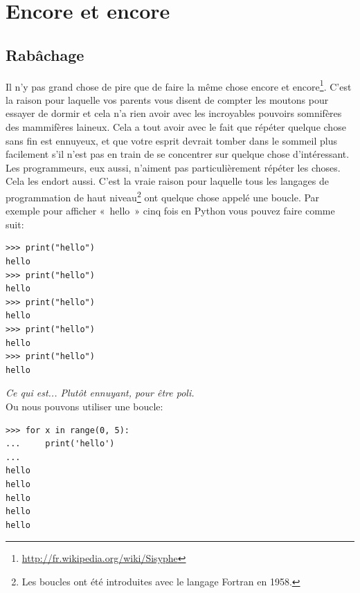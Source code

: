 



\chapter{Encore et encore}
\section{Rabâchage}
Il n'y pas grand chose de pire que de faire la même chose encore et encore\footnote{\url{http://fr.wikipedia.org/wiki/Sisyphe}}.
C'est la raison pour laquelle vos parents vous disent de compter les moutons pour essayer de dormir et cela n'a rien avoir avec les incroyables pouvoirs somnifères des mammifères laineux. Cela  a tout avoir avec le fait que répéter quelque chose sans fin est ennuyeux, et que votre esprit devrait tomber dans le sommeil plus facilement s'il n'est pas en train de se concentrer sur quelque chose d'intéressant.\\


Les programmeurs, eux aussi, n'aiment pas particulièrement répéter les choses. Cela les endort aussi. C'est la vraie raison pour laquelle tous les langages de programmation de haut niveau\footnote{Les boucles ont été introduites avec le langage Fortran en 1958.} ont quelque chose appelé une boucle. Par exemple pour afficher «~hello~»  cinq fois en Python vous pouvez faire comme suit:

\begin{Verbatim}[frame=single,rulecolor=\color{gray}, label=ne pas saisir]
>>> print("hello")
hello
>>> print("hello")
hello
>>> print("hello")
hello
>>> print("hello")
hello
>>> print("hello")
hello
\end{Verbatim}

\emph{Ce qui est... Plutôt ennuyant, pour être poli.}\\


Ou nous pouvons utiliser une boucle:

\begin{Verbatim}[frame=single,rulecolor=\color{green}, label=à taper avec attention]
>>> for x in range(0, 5):
...     print('hello')
...
hello
hello
hello
hello
hello
\end{Verbatim}

